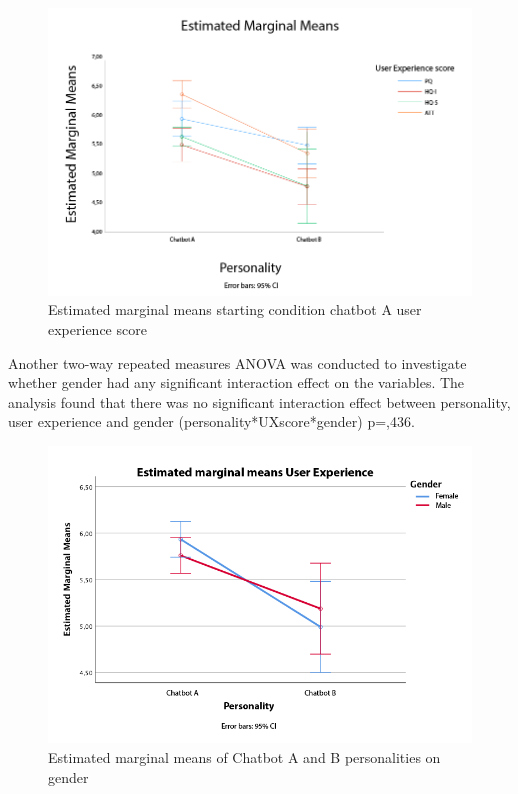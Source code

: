 \begin{figure}[H]
    \centering
    \includegraphics[scale=0.4]{figures/MeansLineUX.png}
    \caption{Estimated marginal means starting condition chatbot A user experience score}
    \label{fig:meansuxline}
\end{figure}

Another two-way repeated measures ANOVA was conducted to investigate whether gender had any significant interaction effect on the variables. The analysis found that there was no significant interaction effect between personality, user experience and gender (personality*UXscore*gender) p=,436.

\begin{figure}[H]
    \centering
    \includegraphics[scale=0.4]{figures/pers-gender.png}
    \caption{Estimated marginal means of Chatbot A and B personalities on gender}
    \label{fig:persgender}
\end{figure}

